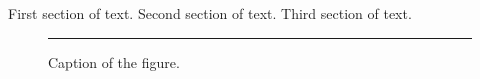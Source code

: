 \documentclass{article}
\begin{document}
First section of text.
Second section of text.
Third section of text.

\begin{figure}
\centering
\rule{7cm}{1cm}
\caption{Caption of the figure.}
\end{figure}
\end{document}
